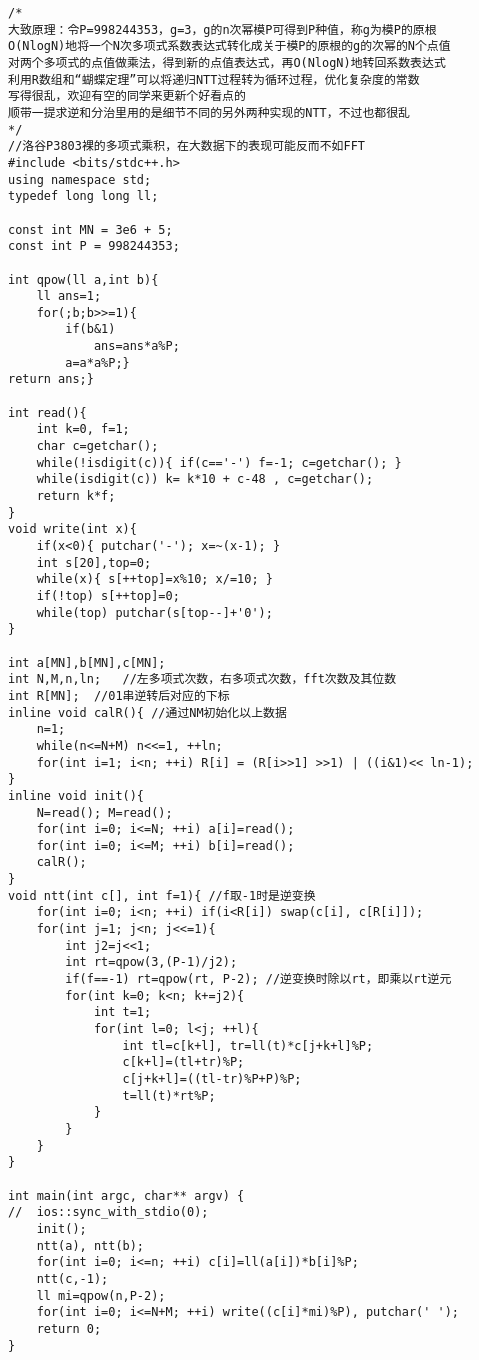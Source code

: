 \begin{lstlisting}
/* 
大致原理：令P=998244353，g=3，g的n次幂模P可得到P种值，称g为模P的原根
O(NlogN)地将一个N次多项式系数表达式转化成关于模P的原根的g的次幂的N个点值 
对两个多项式的点值做乘法，得到新的点值表达式，再O(NlogN)地转回系数表达式
利用R数组和“蝴蝶定理”可以将递归NTT过程转为循环过程，优化复杂度的常数
写得很乱，欢迎有空的同学来更新个好看点的
顺带一提求逆和分治里用的是细节不同的另外两种实现的NTT，不过也都很乱
*/
//洛谷P3803裸的多项式乘积，在大数据下的表现可能反而不如FFT
#include <bits/stdc++.h>
using namespace std;
typedef long long ll;
 
const int MN = 3e6 + 5;
const int P = 998244353;

int qpow(ll a,int b){
	ll ans=1;
	for(;b;b>>=1){
		if(b&1)
			ans=ans*a%P;
		a=a*a%P;}
return ans;}

int read(){
	int k=0, f=1;
	char c=getchar();
	while(!isdigit(c)){ if(c=='-') f=-1; c=getchar(); }
	while(isdigit(c)) k= k*10 + c-48 , c=getchar();
	return k*f;
}
void write(int x){
	if(x<0){ putchar('-'); x=~(x-1); }
	int s[20],top=0;
	while(x){ s[++top]=x%10; x/=10; }
	if(!top) s[++top]=0;
	while(top) putchar(s[top--]+'0');
}

int a[MN],b[MN],c[MN];
int N,M,n,ln;	//左多项式次数，右多项式次数，fft次数及其位数
int R[MN];	//01串逆转后对应的下标
inline void calR(){	//通过NM初始化以上数据
	n=1;
	while(n<=N+M) n<<=1, ++ln;
	for(int i=1; i<n; ++i) R[i] = (R[i>>1] >>1) | ((i&1)<< ln-1);
}
inline void init(){
	N=read(); M=read();
	for(int i=0; i<=N; ++i) a[i]=read();
	for(int i=0; i<=M; ++i) b[i]=read();
	calR();
}
void ntt(int c[], int f=1){	//f取-1时是逆变换
	for(int i=0; i<n; ++i) if(i<R[i]) swap(c[i], c[R[i]]);
	for(int j=1; j<n; j<<=1){
		int j2=j<<1;
		int rt=qpow(3,(P-1)/j2);
		if(f==-1) rt=qpow(rt, P-2);	//逆变换时除以rt，即乘以rt逆元
		for(int k=0; k<n; k+=j2){
			int t=1;
			for(int l=0; l<j; ++l){
				int tl=c[k+l], tr=ll(t)*c[j+k+l]%P;
				c[k+l]=(tl+tr)%P;
				c[j+k+l]=((tl-tr)%P+P)%P;
				t=ll(t)*rt%P;
			}
		}
	}
}

int main(int argc, char** argv) {
//	ios::sync_with_stdio(0);
	init();
	ntt(a), ntt(b);
	for(int i=0; i<=n; ++i) c[i]=ll(a[i])*b[i]%P;
	ntt(c,-1);
	ll mi=qpow(n,P-2);
	for(int i=0; i<=N+M; ++i) write((c[i]*mi)%P), putchar(' ');
	return 0;
}
\end{lstlisting}